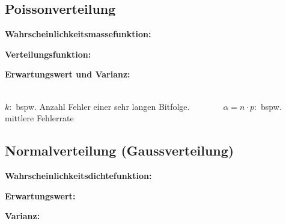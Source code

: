 		\subsection{Poissonverteilung}
			\begin{minipage}{0.4\textwidth}
				\textbf{Wahrscheinlichkeitsmassefunktion:}
			\end{minipage}
			\begin{minipage}{0.25\textwidth}
				\textbf{Verteilungsfunktion:}
			\end{minipage}
			\begin{minipage}{0.35\textwidth}
				\textbf{Erwartungswert und Varianz:}
			\end{minipage}

			\begin{minipage}{0.4\textwidth}
			\end{minipage}
			\begin{minipage}{0.25\textwidth}
			\end{minipage}
			\begin{minipage}{0.35\textwidth}
			\end{minipage}\\[0.2cm]
			$k:$ bspw. Anzahl Fehler einer sehr langen Bitfolge.$\qquad\qquad\alpha=n\cdot p:$ bspw. mittlere Fehlerrate
\newpage
		\subsection{Normalverteilung (Gaussverteilung)}
			\begin{minipage}{0.5\textwidth}
				\textbf{Wahrscheinlichkeitsdichtefunktion:}
			\end{minipage}
			\begin{minipage}{0.25\textwidth}
				\textbf{Erwartungswert:}
			\end{minipage}
			\begin{minipage}{0.25\textwidth}
				\textbf{Varianz:}
			\end{minipage}

			\begin{minipage}{0.5\textwidth}
			\end{minipage}
			\begin{minipage}{0.25\textwidth}
			\end{minipage}
			\begin{minipage}{0.25\textwidth}
			\end{minipage}

